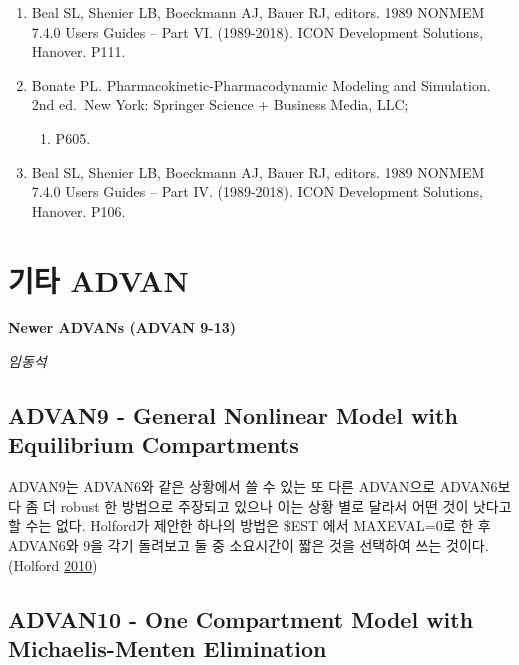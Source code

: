 \documentclass[
  10pt,
]{krantz}
\providecommand{\tightlist}{%
  \setlength{\itemsep}{0pt}\setlength{\parskip}{0pt}}
\begin{document}
\begin{enumerate}
\def\labelenumi{\arabic{enumi}.}
\item
  Beal SL, Shenier LB, Boeckmann AJ, Bauer RJ, editors. 1989 NONMEM
  7.4.0 Users Guides -- Part VI. (1989-2018). ICON Development
  Solutions, Hanover. P111.
\item
  Bonate PL. Pharmacokinetic-Pharmacodynamic Modeling and Simulation.
  2nd ed.~New York: Springer Science + Business Media, LLC;

  \begin{enumerate}
  \def\labelenumii{\arabic{enumii}.}
  \setcounter{enumii}{2010}
  \tightlist
  \item
    P605.
  \end{enumerate}
\item
  Beal SL, Shenier LB, Boeckmann AJ, Bauer RJ, editors. 1989 NONMEM
  7.4.0 Users Guides -- Part IV. (1989-2018). ICON Development
  Solutions, Hanover. P106.
\end{enumerate}

\hypertarget{uxae30uxd0c0-advan}{%
\chapter{기타 ADVAN}\label{uxae30uxd0c0-advan}}

\textbf{Newer ADVANs (ADVAN 9-13)}

\emph{임동석}

\hypertarget{advan9---general-nonlinear-model-with-equilibrium-compartments}{%
\section{ADVAN9 - General Nonlinear Model with Equilibrium Compartments}\label{advan9---general-nonlinear-model-with-equilibrium-compartments}}

ADVAN9는 ADVAN6와 같은 상황에서 쓸 수 있는 또 다른 ADVAN으로 ADVAN6보다 좀 더 robust 한 방법으로 주장되고 있으나 이는 상황 별로 달라서 어떤 것이 낫다고 할 수는 없다. Holford가 제안한 하나의 방법은 \$EST 에서 MAXEVAL=0로 한 후 ADVAN6와 9을 각기 돌려보고 둘 중 소요시간이 짧은 것을 선택하여 쓰는 것이다. (Holford \protect\hyperlink{ref-nickholford}{2010})

\hypertarget{advan10---one-compartment-model-with-michaelis-menten-elimination}{%
\section{ADVAN10 - One Compartment Model with Michaelis-Menten Elimination}\label{advan10---one-compartment-model-with-michaelis-menten-elimination}}
\end{document}
